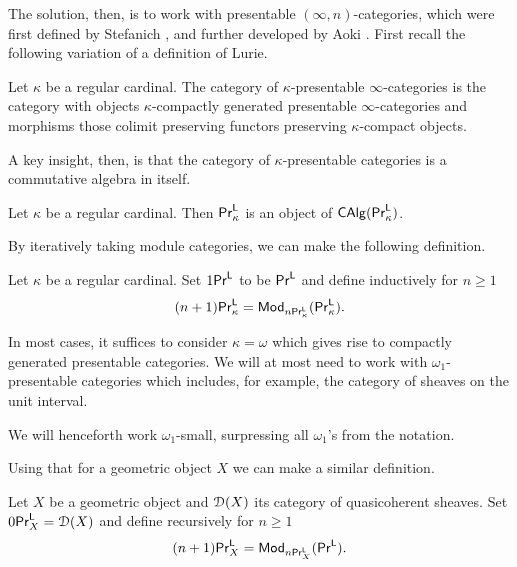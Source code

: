 The solution, then, is to work with presentable $(\infty,n)$-categories, which were first defined by Stefanich \cite{StefanichPrL}, and further developed by Aoki \cite{AokiPrL}. First recall the following variation of a definition of Lurie. 
\begin{definition}\label{def: presentable}
    Let $\kappa$ be a regular cardinal. The category of $\kappa$-presentable $\infty$-categories is the category with objects $\kappa$-compactly generated presentable $\infty$-categories and morphisms those colimit preserving functors preserving $\kappa$-compact objects. 
\end{definition}
A key insight, then, is that the category of $\kappa$-presentable categories is a commutative algebra in itself. 
\begin{proposition}\label{prop: contains itself as CAlg}
    Let $\kappa$ be a regular cardinal. Then $\mathsf{Pr}^{\mathsf{L}}_{\kappa}$ is an object of $\mathsf{CAlg}(\mathsf{Pr}^{\mathsf{L}}_{\kappa})$. 
\end{proposition}
By iteratively taking module categories, we can make the following definition. 
\begin{definition}\label{def: presentable infinity n}
    Let $\kappa$ be a regular cardinal. Set $1\mathsf{Pr}^{\mathsf{L}}$ to be $\mathsf{Pr}^{\mathsf{L}}$ and define inductively for $n\geq 1$ 
    \begin{equation}\label{eqn: nPrL}
        (n+1)\mathsf{Pr}^{\mathsf{L}}_{\kappa}=\mathsf{Mod}_{n\mathsf{Pr}^{\mathsf{L}}_{\kappa}}(\mathsf{Pr}^{\mathsf{L}}_{\kappa}).
    \end{equation}
\end{definition}
\begin{remark}
    In most cases, it suffices to consider $\kappa=\omega$ which gives rise to compactly generated presentable categories. We will at most need to work with $\omega_{1}$-presentable categories which includes, for example, the category of sheaves on the unit interval. 
\end{remark}
\begin{convention}\label{conv: convention}
    We will henceforth work $\omega_{1}$-small, surpressing all $\omega_{1}$'s from the notation. 
\end{convention}
Using that for a geometric object $X$ we can make a similar definition. 
\begin{definition}\label{def: presentable infinity n linear}
    Let $X$ be a geometric object and $\EuScript{D}(X)$ its category of quasicoherent sheaves. Set $0\mathsf{Pr}^{\mathsf{L}}_{X}=\EuScript{D}(X)$ and define recursively for $n\geq 1$
    \begin{equation}\label{eqn: X-linear}
        (n+1)\mathsf{Pr}^{\mathsf{L}}_{X}=\mathsf{Mod}_{n\mathsf{Pr}^{\mathsf{L}}_{X}}(\mathsf{Pr}^{\mathsf{L}}). 
    \end{equation}
\end{definition}
